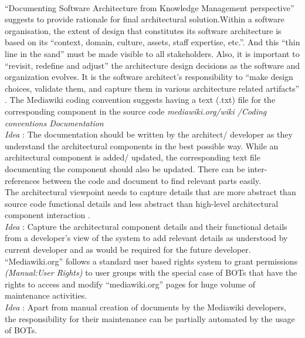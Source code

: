 \\\indent \enquote{Documenting Software Architecture from Knowledge Management perspective} \cite{bab2009} suggests to provide rationale for final architectural solution.Within a software organisation, the extent of design that constitutes its software architecture is based on its \enquote{context, domain, culture, assets, staff expertise, etc.}. And this \enquote{thin line in the sand} must be made visible to all stakeholders. Also, it is important to \enquote{revisit, redefine and adjust} the architecture design decisions as the software and organization evolves. It is the software architect's responsibility to \enquote{make design choices, validate them, and capture them in various architecture related artifacts} \cite{Kruchten2008}. The Mediawiki coding convention suggests having a text (.txt) file for the corresponding component in the source code \emph{mediawiki.org/wiki /Coding conventions Documentation}
\\\indent\emph{Idea} : The documentation should be written by the architect/ developer as they understand the architectural components in the best possible way. While an architectural component is added/ updated, the corresponding text file documenting the component should also be updated. There can be inter-references between the code and document to find relevant parts easily.
\newline
\\\indent The architectural viewpoint needs to capture details that are more abstract than source code functional details and less abstract than high-level architectural component interaction \cite{bab2009}.
\\\indent\emph{Idea} : Capture the architectural component details and their functional details from a developer's view of the system to add relevant details as understood by current developer and as would be required for the future developer.
\newline
\\\indent \enquote{Mediawiki.org} follows a standard user based rights system to grant permissions \emph{(Manual:User Rights)} to user groups with the special case of BOTs that have the rights to access and modify \enquote{mediawiki.org} pages for huge volume of maintenance activities.
\\\indent\emph{Idea} : Apart from manual creation of documents by the Mediawiki developers, the responsibility for their maintenance can be partially automated by the usage of BOTs.





